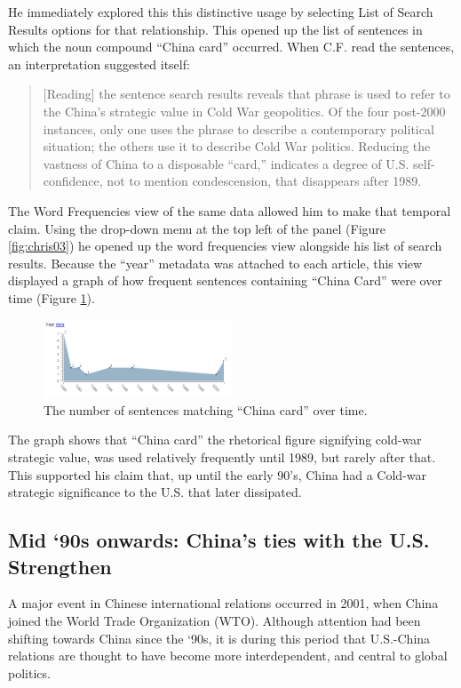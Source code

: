 \documentclass{sig-alternate}
\begin{document}
He immediately explored this this distinctive usage by selecting List of Search Results options for that relationship.  This opened up the list of sentences in which the noun compound ``China card'' occurred.  When C.F. read the sentences, an interpretation suggested itself:
\begin{quote}
[Reading] the sentence search results reveals that phrase is used to refer to the China's strategic value in Cold War geopolitics. Of the four post-2000 instances, only one uses the phrase to describe a contemporary political situation; the others use it to describe Cold War politics. Reducing the vastness of China to a disposable ``card,'' indicates a degree of U.S. self-confidence, not to mention condescension, that disappears after 1989.
\end{quote}

The Word Frequencies view of the same data allowed him to make that temporal claim. Using the drop-down menu at the top left of the panel (Figure \ref{fig:chris03}) he opened up the word frequencies view alongside his list of search results.  Because the ``year'' metadata was attached to each article, this view displayed a graph of how frequent  sentences containing ``China Card'' were over time (Figure \ref{fig:chris02}). 
\begin{figure}[h!]
\includegraphics[width=0.5\textwidth]{fig/chris/02.png}
\caption{ The number of sentences matching ``China card'' over time. \label{fig:chris02}}
\end{figure}
The graph shows that ``China card'' the rhetorical figure signifying cold-war strategic value, was used relatively frequently until 1989, but rarely  after that. This supported his claim that, up until the early 90's, China had a Cold-war strategic significance to the U.S. that later dissipated.

\subsection{Mid `90s onwards: China's ties with the U.S. Strengthen}

A major event in Chinese international relations occurred in 2001, when China joined the World Trade Organization (WTO).  Although attention had been shifting towards China since the `90s, it is during this period that U.S.-China relations are thought to have become more interdependent, and central to global politics. 
\end{document}
